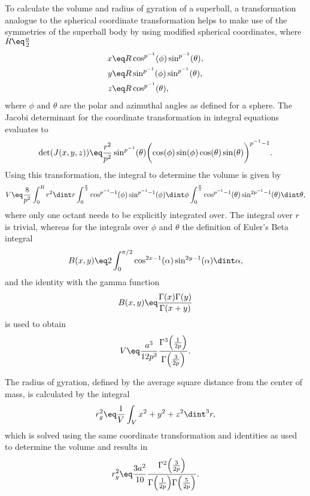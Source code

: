 \documentclass[\main/dresen_thesis.tex]{subfiles}
\begin{document}
    To calculate the volume and radius of gyration of a superball, a transformation analogue to the spherical coordinate transformation helps to make use of the symmetries of the superball body by using modified spherical coordinates, where $R \eq \tfrac{a}{2}$
    \begin{align}
      x &\eq R \cos^{p^{-1}}(\phi) \sin^{p^{-1}}(\theta),\\
      y &\eq R \sin^{p^{-1}}(\phi) \sin^{p^{-1}}(\theta),\\
      z &\eq R \cos^{p^{-1}}(\theta),
    \end{align}
    where $\phi$ and $\theta$ are the polar and azimuthal angles as defined for a sphere.
    The Jacobi determinant for the coordinate transformation in integral equations evaluates to
    \begin{align}
      \det(J(x,y,z)) \eq \frac{r^2}{p^2} \sin^{p^{-1}}(\theta) \biggl(\cos(\phi) \sin(\phi) \cos(\theta) \sin(\theta)\biggr)^{p^{-1}-1}.
    \end{align}
    Using this transformation, the integral to determine the volume is given by
    \begin{align}
      V \eq \frac{8}{p^2}
        \int_{0}^R  r^2 \dint r
        \int_{0}^{\frac{\pi}{2}} \cos^{p^{-1}-1}(\phi) \sin^{p^{-1}-1}(\phi) \dint \phi
        \int_{0}^{\frac{\pi}{2}} \cos^{p^{-1}-1}(\theta) \sin^{2p^{-1}-1}(\theta) \dint \theta,
    \end{align}
    where only one octant needs to be explicitly integrated over.
    The integral over $r$ is trivial, whereas for the integrals over $\phi$ and $\theta$ the definition of Euler's Beta integral \cite{Olver_2010_Handb}
    \begin{align}
      B(x, y) \eq 2 \int_0^{\pi/2} \cos^{2x-1}(\alpha) \sin^{2y-1}(\alpha) \dint \alpha,
    \end{align}
    and the identity with the gamma function
    \begin{align}
      B(x, y) \eq \frac{\Gamma(x) \Gamma(y)}{\Gamma(x+y)}
    \end{align}
    is used to obtain
    \begin{align}
      V \eq \frac{a^3}{12 p^2} \frac{\Gamma^3 \Bigl(\frac{1}{2p} \Bigr)}{\Gamma \Bigl(\frac{3}{2p} \Bigr)}.
    \end{align}

    The radius of gyration, defined by the average square distance from the center of mass, is calculated by the integral
    \begin{align}
      r_g^2 \eq \frac{1}{V} \int_V x^2 + y^2 + z^2 \dint^3 r,
    \end{align}
    which is solved using the same coordinate transformation and identities as used to determine the volume and results in
    \begin{align}
      r_g^2 \eq \frac{3 a^2}{10} \frac{\Gamma^2 \Bigl(\frac{3}{2p} \Bigr)}{\Gamma \Bigl(\frac{1}{2p} \Bigr) \Gamma \Bigl(\frac{5}{2p} \Bigr)}.
    \end{align}
\end{document}
